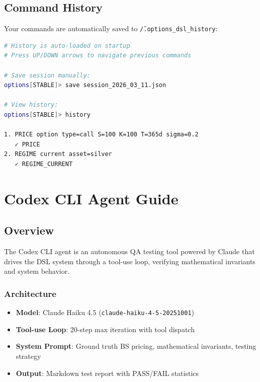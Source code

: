 \documentclass[12pt,oneside,openany]{book}
\begin{document}
\section{Command History}

Your commands are automatically saved to \texttt{\~/.options\_dsl\_history}:

\begin{lstlisting}[language=bash]
# History is auto-loaded on startup
# Press UP/DOWN arrows to navigate previous commands

# Save session manually:
options[STABLE]> save session_2026_03_11.json

# View history:
options[STABLE]> history

1. PRICE option type=call S=100 K=100 T=365d sigma=0.2
   ✓ PRICE
2. REGIME current asset=silver
   ✓ REGIME_CURRENT
\end{lstlisting}

\chapter{Codex CLI Agent Guide}

\section{Overview}

The Codex CLI agent is an autonomous QA testing tool powered by Claude that drives the DSL system through a tool-use loop, verifying mathematical invariants and system behavior.

\subsection{Architecture}

\begin{itemize}
    \item \textbf{Model}: Claude Haiku 4.5 (\texttt{claude-haiku-4-5-20251001})
    \item \textbf{Tool-use Loop}: 20-step max iteration with tool dispatch
    \item \textbf{System Prompt}: Ground truth BS pricing, mathematical invariants, testing strategy
    \item \textbf{Output}: Markdown test report with PASS/FAIL statistics
\end{itemize}
\end{document}

